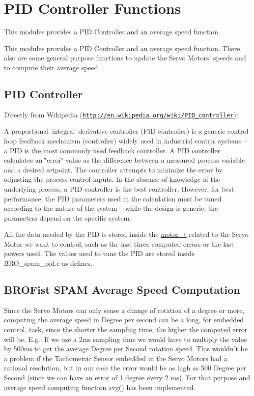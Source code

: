 \hypertarget{group___b_r_o_s_pid}{
\section{PID Controller Functions}
\label{group___b_r_o_s_pid}
}


This modules provides a PID Controller and an average speed function.  


This modules provides a PID Controller and an average speed function. There also are some general purpose functions to update the Servo Motors' speeds and to compute their average speed.\hypertarget{group___b_r_o_s_pid_PIDController}{}\subsection{PID Controller}\label{group___b_r_o_s_pid_PIDController}
Directly from Wikipedia (\href{http://en.wikipedia.org/wiki/PID_controller}{\tt http://en.wikipedia.org/wiki/PID\_\-controller}):

A proportional–integral–derivative controller (PID controller) is a generic control loop feedback mechanism (controller) widely used in industrial control systems – a PID is the most commonly used feedback controller. A PID controller calculates an \char`\"{}error\char`\"{} value as the difference between a measured process variable and a desired setpoint. The controller attempts to minimize the error by adjusting the process control inputs. In the absence of knowledge of the underlying process, a PID controller is the best controller. However, for best performance, the PID parameters used in the calculation must be tuned according to the nature of the system – while the design is generic, the parameters depend on the specific system.

All the data needed by the PID is stored inside the \hyperlink{structmotor__t}{motor\_\-t} related to the Servo Motor we want to control, such as the last three computed errors or the last powers used. The values used to tune the PID are stored inside {\ttfamily BRO\_\-spam\_\-pid.c} as defines.\hypertarget{group___b_r_o_s_pid_BROSAvgSpd}{}\subsection{BROFist SPAM Average Speed Computation}\label{group___b_r_o_s_pid_BROSAvgSpd}
Since the Servo Motors can only sense a change of rotation of a degree or more, computing the average speed in Degree per second can be a long, for embedded control, task, since the shorter the sampling time, the higher the computed error will be. E.g.: If we use a 2ms sampling time we would have to multiply the value by 500ms to get the average Degree per Second rotation speed. This wouldn't be a problem if the Tachometric Sensor embedded in the Servo Motors had a rational resolution, but in our case the error would be as high as 500 Degree per Second (since we can have an error of 1 degree every 2 ms). For that purpose and average speed computing function avg() has been implemented. 